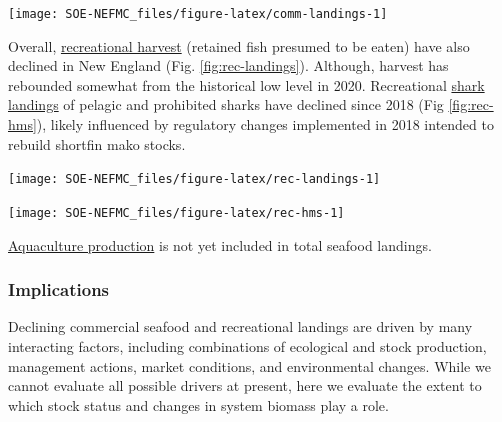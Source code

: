 \documentclass[
  10pt,
]{article}
\let\origfigure\figure
\let\endorigfigure\endfigure
\renewenvironment{figure}[1][2] {
    \expandafter\origfigure\expandafter[H]
} {
    \endorigfigure
}
\begin{document}
\begin{figure}

{\centering \texttt{[image: SOE-NEFMC\_files/figure-latex/comm-landings-1]} 

}

\caption{Total commercial landings (black) and NEFMC managed U.S seafood landings (red) by feeding guild for the Gulf of Maine (GOM, right) and Georges Bank (GB, left).}\label{fig:comm-landings}
\end{figure}

Overall, \href{https://noaa-edab.github.io/catalog/recdat.html}{recreational harvest} (retained fish presumed to be eaten) have also declined in New England (Fig. \ref{fig:rec-landings}). Although, harvest has rebounded somewhat from the historical low level in 2020. Recreational \href{https://noaa-edab.github.io/catalog/rec_hms.html}{shark landings} of pelagic and prohibited sharks have declined since 2018 (Fig \ref{fig:rec-hms}), likely influenced by regulatory changes implemented in 2018 intended to rebuild shortfin mako stocks.

\begin{figure}

{\centering \texttt{[image: SOE-NEFMC\_files/figure-latex/rec-landings-1]} 

}

\caption{Total recreational seafood harvest (millions of pounds) in the New England region.}\label{fig:rec-landings}
\end{figure}
\begin{figure}

{\centering \texttt{[image: SOE-NEFMC\_files/figure-latex/rec-hms-1]} 

}

\caption{Recreational shark landings from Large Pelagics Survey.}\label{fig:rec-hms}
\end{figure}

\href{https://noaa-edab.github.io/catalog/aquaculture.html}{Aquaculture production} is not yet included in total seafood landings.

\hypertarget{implications}{%
\subsubsection{Implications}\label{implications}}

Declining commercial seafood and recreational landings are driven by many interacting factors, including combinations of ecological and stock production, management actions, market conditions, and environmental changes. While we cannot evaluate all possible drivers at present, here we evaluate the extent to which stock status and changes in system biomass play a role.
\end{document}
